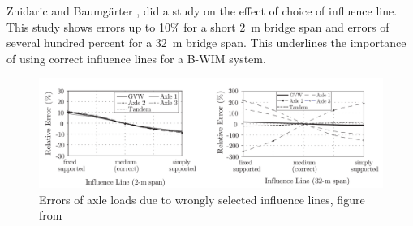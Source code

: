 Znidaric and Baumgärter \cite{bwim_an_overview}, did a study on the effect of choice of influence line. This study shows errors up to 10\% for a short \SI{2}{\metre} bridge span and errors of several hundred percent for a \SI{32}{\metre} bridge span. This underlines the importance of using correct influence lines for a B-WIM system.
\begin{figure}[h]
\centering
\includegraphics[scale=0.5]{figures/error_in_weights_dueTo_infl}
\caption{Errors of axle loads due to wrongly selected influence lines, figure from \cite{Quilligan}}
\label{fig:errorOfInfl}
\end{figure}

